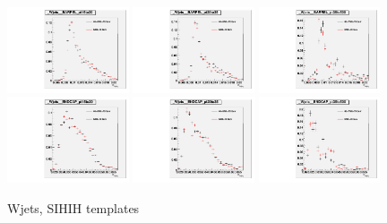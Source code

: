 \begin{figure}[htb]
  \begin{center}
  \includegraphics[width=0.32\textwidth]{../figs/figs_v11/ChannelsMERGED_WGamma/QuickChecks/cTemplatesVsWMt_Wjets_phoSigmaIEtaIEta_BARREL_pt15to20.pdf} \includegraphics[width=0.32\textwidth]{../figs/figs_v11/ChannelsMERGED_WGamma/QuickChecks/cTemplatesVsWMt_Wjets_phoSigmaIEtaIEta_BARREL_pt20to35.pdf} \includegraphics[width=0.32\textwidth]{../figs/figs_v11/ChannelsMERGED_WGamma/QuickChecks/cTemplatesVsWMt_Wjets_phoSigmaIEtaIEta_BARREL_pt35to500.pdf}\\
  \includegraphics[width=0.32\textwidth]{../figs/figs_v11/ChannelsMERGED_WGamma/QuickChecks/cTemplatesVsWMt_Wjets_phoSigmaIEtaIEta_ENDCAP_pt15to20.pdf} \includegraphics[width=0.32\textwidth]{../figs/figs_v11/ChannelsMERGED_WGamma/QuickChecks/cTemplatesVsWMt_Wjets_phoSigmaIEtaIEta_ENDCAP_pt20to35.pdf} \includegraphics[width=0.32\textwidth]{../figs/figs_v11/ChannelsMERGED_WGamma/QuickChecks/cTemplatesVsWMt_Wjets_phoSigmaIEtaIEta_ENDCAP_pt35to500.pdf}\\
  \caption{Wjets, SIHIH templates}
  \label{fig:templatesVsWMt_Wjets_SIHIH}
  \end{center}
\end{figure}

